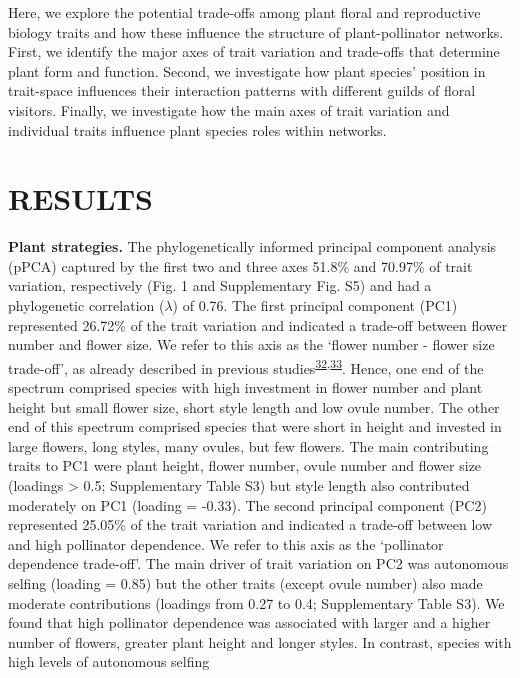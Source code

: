 \documentclass[12pt,a4paper,]{article}
\begin{document}
Here, we explore the potential trade-offs among plant floral and
reproductive biology traits and how these influence the structure of
plant-pollinator networks. First, we identify the major axes of trait
variation and trade-offs that determine plant form and function. Second,
we investigate how plant species' position in trait-space influences
their interaction patterns with different guilds of floral visitors.
Finally, we investigate how the main axes of trait variation and
individual traits influence plant species roles within networks.

\section{RESULTS}\label{results}

\textbf{Plant strategies.} The phylogenetically informed principal
component analysis (pPCA) captured by the first two and three axes
51.8\% and 70.97\% of trait variation, respectively (Fig. 1 and
Supplementary Fig. S5) and had a phylogenetic correlation (\(\lambda\))
of 0.76. The first principal component (PC1) represented 26.72\% of the
trait variation and indicated a trade-off between flower number and
flower size. We refer to this axis as the `flower number - flower size
trade-off', as already described in previous
studies\textsuperscript{\protect\hyperlink{ref-sargent2007}{32},\protect\hyperlink{ref-kettle2011}{33}}.
Hence, one end of the spectrum comprised species with high investment in
flower number and plant height but small flower size, short style length
and low ovule number. The other end of this spectrum comprised species
that were short in height and invested in large flowers, long styles,
many ovules, but few flowers. The main contributing traits to PC1 were
plant height, flower number, ovule number and flower size (loadings
\textgreater{} \textbar{}0.5\textbar{}; Supplementary Table S3) but
style length also contributed moderately on PC1 (loading = -0.33). The
second principal component (PC2) represented 25.05\% of the trait
variation and indicated a trade-off between low and high pollinator
dependence. We refer to this axis as the `pollinator dependence
trade-off'. The main driver of trait variation on PC2 was autonomous
selfing (loading = 0.85) but the other traits (except ovule number) also
made moderate contributions (loadings from 0.27 to 0.4; Supplementary
Table S3). We found that high pollinator dependence was associated with
larger and a higher number of flowers, greater plant height and longer
styles. In contrast, species with high levels of autonomous selfing
\end{document}
